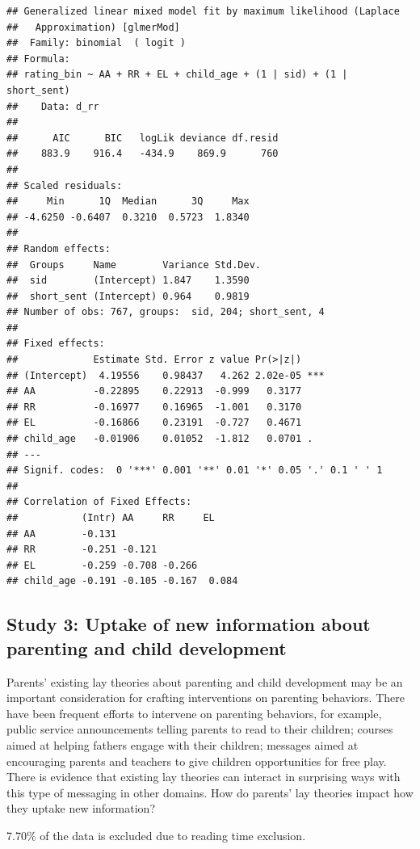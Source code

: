 \documentclass[floatsintext,man]{apa6}
\theoremstyle{definition}
\theoremstyle{definition}
\theoremstyle{definition}
\theoremstyle{remark}
\begin{document}
\begin{verbatim}
## Generalized linear mixed model fit by maximum likelihood (Laplace
##   Approximation) [glmerMod]
##  Family: binomial  ( logit )
## Formula: 
## rating_bin ~ AA + RR + EL + child_age + (1 | sid) + (1 | short_sent)
##    Data: d_rr
## 
##      AIC      BIC   logLik deviance df.resid 
##    883.9    916.4   -434.9    869.9      760 
## 
## Scaled residuals: 
##     Min      1Q  Median      3Q     Max 
## -4.6250 -0.6407  0.3210  0.5723  1.8340 
## 
## Random effects:
##  Groups     Name        Variance Std.Dev.
##  sid        (Intercept) 1.847    1.3590  
##  short_sent (Intercept) 0.964    0.9819  
## Number of obs: 767, groups:  sid, 204; short_sent, 4
## 
## Fixed effects:
##             Estimate Std. Error z value Pr(>|z|)    
## (Intercept)  4.19556    0.98437   4.262 2.02e-05 ***
## AA          -0.22895    0.22913  -0.999   0.3177    
## RR          -0.16977    0.16965  -1.001   0.3170    
## EL          -0.16866    0.23191  -0.727   0.4671    
## child_age   -0.01906    0.01052  -1.812   0.0701 .  
## ---
## Signif. codes:  0 '***' 0.001 '**' 0.01 '*' 0.05 '.' 0.1 ' ' 1
## 
## Correlation of Fixed Effects:
##           (Intr) AA     RR     EL    
## AA        -0.131                     
## RR        -0.251 -0.121              
## EL        -0.259 -0.708 -0.266       
## child_age -0.191 -0.105 -0.167  0.084
\end{verbatim}

\subsection{Study 3: Uptake of new information about parenting and child
development}\label{study-3-uptake-of-new-information-about-parenting-and-child-development}

Parents' existing lay theories about parenting and child development may
be an important consideration for crafting interventions on parenting
behaviors. There have been frequent efforts to intervene on parenting
behaviors, for example, public service announcements telling parents to
read to their children; courses aimed at helping fathers engage with
their children; messages aimed at encouraging parents and teachers to
give children opportunities for free play. There is evidence that
existing lay theories can interact in surprising ways with this type of
messaging in other domains. How do parents' lay theories impact how they
uptake new information?

7.70\% of the data is excluded due to reading time exclusion.
\end{document}
